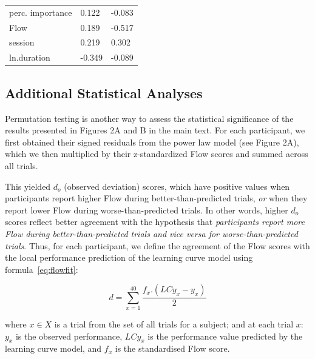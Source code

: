 \documentclass[fleqn,10pt]{wlscirep}
\begin{document}
\begin{minipage}{\textwidth}
\begin{minipage}{.4\textwidth}
\begin{tabular}{lll}
perc. importance & 0.122  & -0.083 \\
Flow             & 0.189  & -0.517 \\
session          & 0.219  & 0.302  \\
ln.duration      & -0.349 & -0.089
\end{tabular}
\end{minipage}
\end{minipage}

\subsection*{Additional Statistical Analyses}

Permutation testing is another way to assess the statistical significance of the results presented in Figures 2A and B in the main text. For each participant, we first obtained their signed residuals from the power law model (see Figure 2A), which we then multiplied by their z-standardized Flow scores and summed across all trials.

This yielded $d_o$ (observed deviation) scores, which have positive values when participants report higher Flow during better-than-predicted trials, {\it or} when they report lower Flow during worse-than-predicted trials. In other words, higher $d_o$ scores reflect better agreement with the hypothesis that {\it participants report more Flow during better-than-predicted trials and vice versa for worse-than-predicted trials}. Thus, for each participant, we define the agreement of the Flow scores with the local performance prediction of the learning curve model using formula~\ref{eq:flowfit}:

\begin{equation}
	\label{eq:flowfit}
	d = \sum_{x=1}^{40} \frac{f_x.(LCy_x - y_x)}{2}
\end{equation}

where $x\in X$ is a trial from the set of all trials for a subject; and at each trial $x$: $y_x$ is the observed performance, $LCy_x$ is the performance value predicted by the learning curve model, and $f_x$ is the standardised Flow score.
\end{document}
